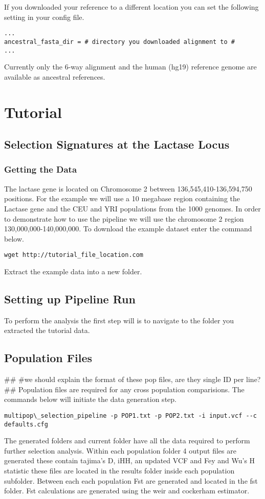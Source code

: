 \documentclass[a4paper,10pt]{article}
\begin{document}
If you downloaded your reference to a different location you can set the following setting in your config file.\\
\begin{verbatim}
...
ancestral_fasta_dir = # directory you downloaded alignment to #
...
\end{verbatim}

Currently only the 6-way alignment and the human (hg19) reference genome are available as ancestral references.
\section{Tutorial}
\subsection{Selection Signatures at the Lactase Locus}
\subsubsection{Getting the Data}
The lactase gene is located on Chromosome 2 between 136,545,410-136,594,750 positions. For the example we will use a 10 megabase region containing the Lactase gene and the CEU and YRI populations from the 1000 genomes. In order to demonstrate how to use the pipeline we will use the chromosome 2 region 130,000,000-140,000,000. To download the example dataset enter the command below. \\

\begin{verbatim}
wget http://tutorial_file_location.com 
\end{verbatim}

Extract the example data into a new folder.

\subsection{Setting up Pipeline Run}
To perform the analysis the first step will is to navigate to the folder you extracted the tutorial data.
\subsection{Population Files}
##
#we should explain the format of these pop files, are they single ID per line?
##
Population files are required for any cross population comparisions. The commands below will initiate the data generation step.\\
\begin{verbatim}
multipop\_selection_pipeline -p POP1.txt -p POP2.txt -i input.vcf --c defaults.cfg
\end{verbatim}
The generated folders and current folder have all the data required to perform further selection analysis. Within each population folder 4 output files are generated these contain tajima's D, iHH, an updated VCF and Fey and Wu's H statistic these files are located in the results folder inside each population subfolder. Between each each population Fst are generated and located in the fst folder. Fst calculations are generated using the weir and cockerham estimator.
\end{document}
